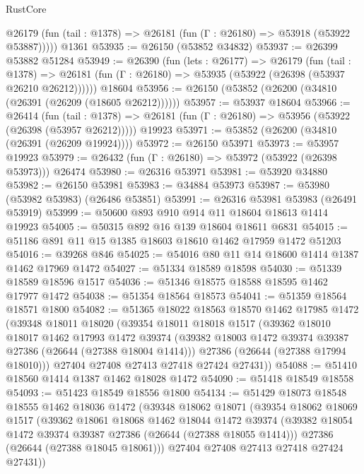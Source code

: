 \begin{lexlean}{RustCore}
\begin{coremodule}
      @26179 (fun (tail : @1378) => @26181 (fun (Γ : @26180) => @53918 (@53922 @53887)))))
    @1361
@53935 := @26150 (@53852 @34832)
@53937 := @26399 @53882 @51284
@53949 := @26390
    (fun (lets : @26177) =>
    @26179
      (fun (tail : @1378) =>
      @26181 (fun (Γ : @26180) => @53935 (@53922 (@26398 (@53937 @26210 @26212))))))
    @18604
@53956 := @26150 (@53852 (@26200 (@34810 (@26391 (@26209 (@18605 @26212))))))
@53957 := @53937 @18604
@53966 := @26414
    (fun (tail : @1378) => @26181 (fun (Γ : @26180) => @53956 (@53922 (@26398 (@53957 @26212)))))
    @19923
@53971 := @53852 (@26200 (@34810 (@26391 (@26209 @19924))))
@53972 := @26150 @53971
@53973 := @53957 @19923
@53979 := @26432 (fun (Γ : @26180) => @53972 (@53922 (@26398 @53973))) @26474
@53980 := @26316 @53971
@53981 := @53920 @34880
@53982 := @26150 @53981
@53983 := @34884 @53973
@53987 := @53980 (@53982 @53983) (@26486 @53851)
@53991 := @26316 @53981 @53983 (@26491 @53919)
@53999 := @50600 @893 @910 @914 @11 @18604 @18613 @1414 @19923
@54005 := @50315 @892 @16 @139 @18604 @18611 @6831
@54015 := @51186 @891 @11 @15 @1385 @18603 @18610 @1462 @17959 @1472 @51203
@54016 := @39268 @846
@54025 := @54016 @80 @11 @14 @18600 @1414 @1387 @1462 @17969 @1472
@54027 := @51334 @18589 @18598
@54030 := @51339 @18589 @18596 @1517
@54036 := @51346 @18575 @18588 @18595 @1462 @17977 @1472
@54038 := @51354 @18564 @18573
@54041 := @51359 @18564 @18571 @1800
@54082 := @51365
    @18022
    @18563
    @18570
    @1462
    @17985
    @1472
    (@39348
      @18011
      @18020
      (@39354
        @18011
        @18018
        @1517
        (@39362
          @18010
          @18017
          @1462
          @17993
          @1472
          @39374
          (@39382 @18003 @1472 @39374 @39387 @27386 (@26644 (@27388 @18004 @1414)))
          @27386
          (@26644 (@27388 @17994 @18010)))
        @27404
        @27408
        @27413
        @27418
        @27424
        @27431))
@54088 := @51410 @18560 @1414 @1387 @1462 @18028 @1472
@54090 := @51418 @18549 @18558
@54093 := @51423 @18549 @18556 @1800
@54134 := @51429
    @18073
    @18548
    @18555
    @1462
    @18036
    @1472
    (@39348
      @18062
      @18071
      (@39354
        @18062
        @18069
        @1517
        (@39362
          @18061
          @18068
          @1462
          @18044
          @1472
          @39374
          (@39382 @18054 @1472 @39374 @39387 @27386 (@26644 (@27388 @18055 @1414)))
          @27386
          (@26644 (@27388 @18045 @18061)))
        @27404
        @27408
        @27413
        @27418
        @27424
        @27431))

\end{coremodule}
\end{lexlean}
